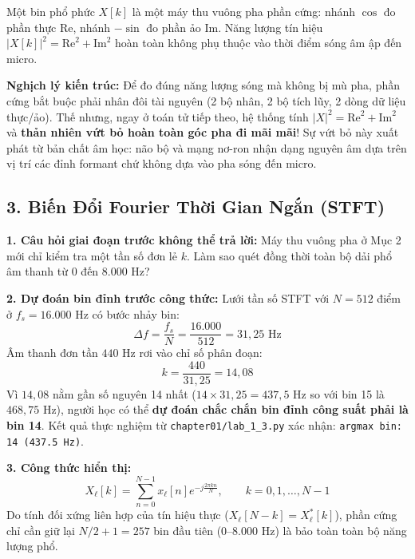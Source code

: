 \documentclass[11pt,a4paper]{article}
\begin{document}
\begin{groundbreaking}
Một bin phổ phức $X[k]$ là một máy thu vuông pha phần cứng: nhánh $\cos$ đo phần thực $\text{Re}$, nhánh $-\sin$ đo phần ảo $\text{Im}$. Năng lượng tín hiệu $|X[k]|^2 = \text{Re}^2 + \text{Im}^2$ hoàn toàn không phụ thuộc vào thời điểm sóng âm ập đến micro.
\end{groundbreaking}

\textbf{Nghịch lý kiến trúc:} Để đo đúng năng lượng sóng mà không bị mù pha, phần cứng bắt buộc phải nhân đôi tài nguyên (2 bộ nhân, 2 bộ tích lũy, 2 dòng dữ liệu thực/ảo). Thế nhưng, ngay ở toán tử tiếp theo, hệ thống tính $|X|^2 = \text{Re}^2 + \text{Im}^2$ và \textbf{thản nhiên vứt bỏ hoàn toàn góc pha đi mãi mãi}! Sự vứt bỏ này xuất phát từ bản chất âm học: não bộ và mạng nơ-ron nhận dạng nguyên âm dựa trên vị trí các đỉnh formant chứ không dựa vào pha sóng đến micro.

\clearpage


\subsection*{3. Biến Đổi Fourier Thời Gian Ngắn (STFT)}

\textbf{1. Câu hỏi giai đoạn trước không thể trả lời:} Máy thu vuông pha ở Mục 2 mới chỉ kiểm tra một tần số đơn lẻ $k$. Làm sao quét đồng thời toàn bộ dải phổ âm thanh từ $0$ đến $8.000\text{ Hz}$?

\textbf{2. Dự đoán bin đỉnh trước công thức:} Lưới tần số STFT với $N = 512$ điểm ở $f_s = 16.000\text{ Hz}$ có bước nhảy bin:
\[
\Delta f = \frac{f_s}{N} = \frac{16.000}{512} = 31{,}25\text{ Hz}
\]
Âm thanh đơn tần $440\text{ Hz}$ rơi vào chỉ số phân đoạn:
\[
k = \frac{440}{31{,}25} = 14{,}08
\]
Vì $14{,}08$ nằm gần số nguyên 14 nhất ($14 \times 31{,}25 = 437{,}5\text{ Hz}$ so với bin 15 là $468{,}75\text{ Hz}$), người học có thể \textbf{dự đoán chắc chắn bin đỉnh công suất phải là bin 14}. Kết quả thực nghiệm từ \nolinkurl{chapter01/lab_1_3.py} xác nhận: \texttt{argmax bin: 14 (437.5 Hz)}.

\textbf{3. Công thức hiển thị:}
\[
X_\ell[k] = \sum_{n=0}^{N-1} x_\ell[n] e^{-j \frac{2\pi k n}{N}}, \qquad k = 0, 1, \dots, N-1
\]
Do tính đối xứng liên hợp của tín hiệu thực ($X_\ell[N - k] = X_\ell^*[k]$), phần cứng chỉ cần giữ lại $N/2 + 1 = 257$ bin đầu tiên ($0\text{--}8.000\text{ Hz}$) là bảo toàn toàn bộ năng lượng phổ.
\end{document}
